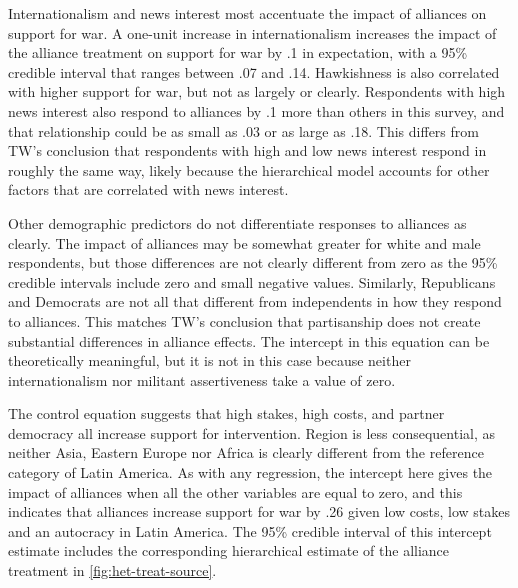 \documentclass[12pt]{article}
\begin{document}
Internationalism and news interest most accentuate the impact of alliances on support for war. 
A one-unit increase in internationalism increases the impact of the alliance treatment on support for war by .1 in expectation, with a 95\% credible interval that ranges between .07 and .14. 
Hawkishness is also correlated with higher support for war, but not as largely or clearly. 
Respondents with high news interest also respond to alliances by .1 more than others in this survey, and that relationship could be as small as .03 or as large as .18.
This differs from TW's conclusion that respondents with high and low news interest respond in roughly the same way, likely because the hierarchical model accounts for other factors that are correlated with news interest.


Other demographic predictors do not differentiate responses to alliances as clearly. 
The impact of alliances may be somewhat greater for white and male respondents, but those differences are not clearly different from zero as the 95\% credible intervals include zero and small negative values.
Similarly, Republicans and Democrats are not all that different from independents in how they respond to alliances.
This matches TW's conclusion that partisanship does not create substantial differences in alliance effects.
The intercept in this equation can be theoretically meaningful, but it is not in this case because neither internationalism nor militant assertiveness take a value of zero. 


The control equation suggests that high stakes, high costs, and partner democracy all increase support for intervention.
Region is less consequential, as neither Asia, Eastern Europe nor Africa is clearly different from the reference category of Latin America.
As with any regression, the intercept here gives the impact of alliances when all the other variables are equal to zero, and this indicates that alliances increase support for war by .26 given low costs, low stakes and an autocracy in Latin America.
The 95\% credible interval of this intercept estimate includes the corresponding hierarchical estimate of the alliance treatment in \autoref{fig:het-treat-source}.
\end{document}
